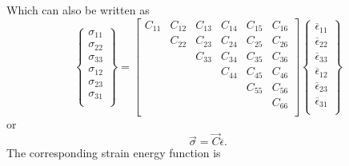 Which can also be written as
\begin{equation*}
  \left\{ \begin{array}{cccccc}
    \sigma_{11}\\
  \sigma_{22}\\
  \sigma_{33}\\
  \sigma_{12}\\
  \sigma_{23}\\
  \sigma_{31}\\
  \end{array} \right\} = \begin{bmatrix}
    C_{11} & C_{12} & C_{13} & C_{14} & C_{15} & C_{16}\\
   & C_{22} & C_{23} & C_{24} & C_{25} & C_{26}\\
   &  & C_{33} & C_{34} & C_{35} & C_{36}\\
   &  &  & C_{44} & C_{45} & C_{46}\\
   &  &  &  & C_{55} & C_{56}\\
   &  &  &  &  &C_{66} \\
  \end{bmatrix} \left\{ \begin{array}{cccccc}
    \overline{\epsilon}_{11}\\
  \overline{\epsilon}_{22}\\
  \overline{\epsilon}_{33}\\
  \overline{\epsilon}_{12}\\
  \overline{\epsilon}_{23}\\
  \overline{\epsilon}_{31}\\
  \end{array} \right\}
\end{equation*}
or
\begin{equation*}
  \Vec{\sigma} =\Vec{C} \overline{\epsilon}
.\end{equation*}
The corresponding strain energy function is
